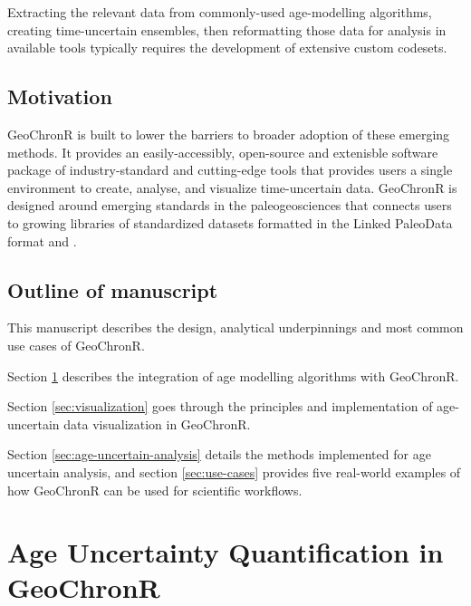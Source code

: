 \documentclass[gc, manuscript]{copernicus}
\begin{document}
Extracting the relevant data from commonly-used age-modelling algorithms, creating time-uncertain ensembles, then reformatting those data for analysis in available tools typically requires the development of extensive custom codesets.

\subsection{Motivation}

GeoChronR is built to lower the barriers to broader adoption of these emerging methods.
It provides an easily-accessibly, open-source and extenisble software package of industry-standard and cutting-edge tools that provides users a single environment to create, analyse, and visualize time-uncertain data.
GeoChronR is designed around emerging standards in the paleogeosciences that connects users to growing libraries of standardized datasets formatted in the Linked PaleoData format \citep{LiPD} and \citep{neotoma}.

\subsection{Outline of manuscript}

This manuscript describes the design, analytical underpinnings and most common use cases of GeoChronR.

Section \ref{sec:age-modeling} describes the integration of age modelling algorithms with GeoChronR.

Section \ref{sec:visualization} goes through the principles and implementation of age-uncertain data visualization in GeoChronR.

Section \ref{sec:age-uncertain-analysis} details the methods implemented for age uncertain analysis, and section \ref{sec:use-cases} provides five real-world examples of how GeoChronR can be used for scientific workflows.

\hypertarget{sec:age-modeling}{%
\section{Age Uncertainty Quantification in GeoChronR}\label{sec:age-modeling}}
\end{document}
